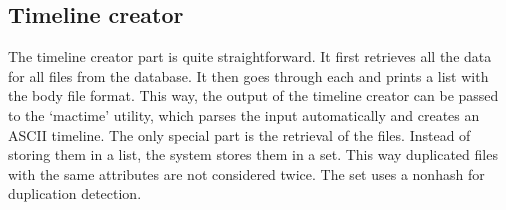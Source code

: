 \subsection{Timeline creator}
\label{sec:Timeliner}

The timeline creator part is quite straightforward. It first retrieves all the data for all files from the database. It then goes through each and prints a list with the body file format. This way, the output of the timeline creator can be passed to the `mactime' utility, which parses the input automatically and creates an ASCII timeline. The only special part is the retrieval of the files. Instead of storing them in a list, the system stores them in a set. This way duplicated files with the same attributes are not considered twice. The set uses a \gls{nonhash} for duplication detection.

